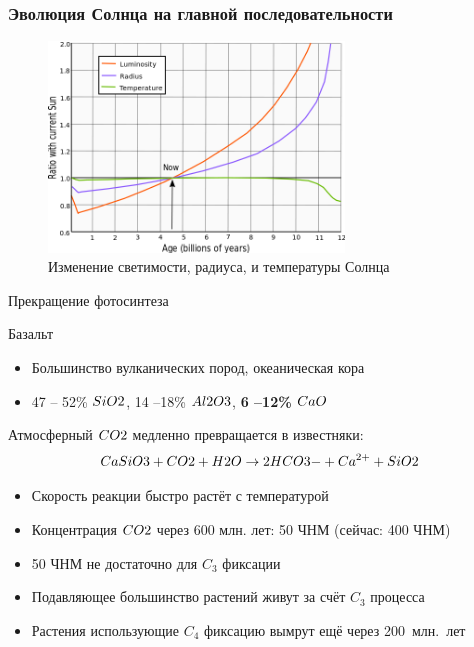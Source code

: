 \documentclass[aspectratio=169]{beamer}
\let\Ch\ch
\let\ch\relax
\begin{document}
\begin{frame}
\frametitle{Эволюция Солнца на главной последовательности}
\begin{figure}
\includegraphics[width=0.7\textwidth]{img/640px-Solar_evolution_(English).png}
\captionsetup{labelformat=empty}
\caption{Изменение светимости, радиуса, и температуры Солнца\cite{arXiv:0911.4872}}
\end{figure}
\end{frame}


\begin{frame}{Прекращение фотосинтеза}
\begin{block}{Базальт}
\begin{itemize}
\item Большинство вулканических пород, океаническая кора
\item 47 -- 52\% $\Ch{SiO2}$, 14 --18\% $\Ch{Al2O3}$, {\bf 6 --12\% $\Ch{CaO}$}
\end{itemize}
\end{block}
Атмосферный $\Ch{CO2}$ медленно превращается в известняки:
\begin{displaymath}
\nonumber
\Ch{CaSiO3} + \Ch{CO2} + \Ch{H2O} \to 2 \Ch{HCO3-} + \Ch{Ca^{2+}} + \Ch{SiO2}
\end{displaymath}

\begin{itemize}
\item Скорость реакции быстро растёт с температурой
\item Концентрация $\Ch{CO2}$ через 600 млн. лет: 50 ЧНМ (сейчас: 400 ЧНМ)
\item 50 ЧНМ не достаточно для $C_3$ фиксации
\item Подавляющее большинство растений живут за счёт $C_3$ процесса
\item Растения использующие $C_4$ фиксацию вымрут ещё через 200~млн.~лет
\end{itemize}

\end{frame}
\end{document}
